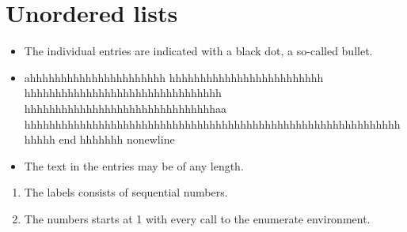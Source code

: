 \documentclass{article}
\begin{document}
\section{Unordered lists}

\begin{itemize}
\item The individual entries are indicated with a black dot, a so-called bullet.
\item ahhhhhhhhhhhhhhhhhhhhhh hhhhhhhhhhhhhhhhhhhhhhhhh hhhhhhhhhhhhhhhhhhhhhhhhhhhhhhhh hhhhhhhhhhhhhhhhhhhhhhhhhhhhhhhaa\\hhhhhhhhhhhhhhhhhhhhhhhhhhhhhhhhhhhhhhhhhhhhhhhhhhhhhhhhhhhhhhhhhh end\newline
hhhhhhh
nonewline
\item The text in the entries may be of any length.
\end{itemize}

\begin{enumerate}
\item The labels consists of sequential numbers.
\item The numbers starts at 1 with every call to the enumerate environment.
\end{enumerate}
\end{document}

